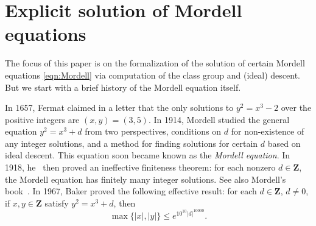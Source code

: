 \documentclass[sigplan,10pt,nonacm,
screen]{acmart} \settopmatter{printfolios=true,printccs=false,printacmref=false}
\newcommand{\ZZ}{\mathbf{Z}}
\DeclareMathOperator{\Cl}{Cl}
\begin{document}

\section{Explicit solution of Mordell equations}\label{sec:Mordell}

The focus of this paper is on the formalization of the solution of certain Mordell equations \eqref{eqn:Mordell} via computation of the class group and (ideal) descent. But we start with a brief history of the Mordell equation itself.

In 1657, Fermat claimed in a letter that the only solutions to $y^2 = x^3 - 2$ over the positive integers are $(x,y)= (3, 5)$.
%
In 1914, Mordell \cite{mordell14} studied the general equation $y^2 = x^3 + d$ from two perspectives, conditions on $d$ for non-existence of any integer solutions, and a method for finding solutions for certain $d$ based on ideal descent.
This equation soon became known as the \emph{Mordell equation}.
%
In 1918, he~\cite{mordell1920} then proved an ineffective finiteness theorem: for each nonzero $d \in \ZZ$, the Mordell equation has finitely many integer solutions.
See also Mordell's book~\cite[Chapter 26]{mordell1969diophantine}.
%
%
In 1967, Baker \cite{baker68} proved the following effective result: for each $d \in \ZZ$, $d \neq 0$, if $x,y \in \ZZ$ satisfy $y^2=x^3+d$, then
    \begin{equation}\label{eqn:BakerBoundMordell}
        \max\{|x|,|y|\} \leq e^{10^{10}|d|^{10000}}.
    \end{equation}
%
\end{document}
